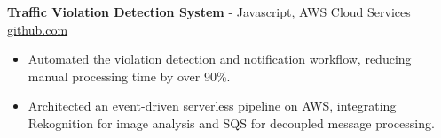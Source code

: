 \documentclass[11pt]{article}       %
\begin{document}

\textbf{Traffic Violation Detection System}{ - Javascript, AWS Cloud Services} \hfill \href{https://github.com/Monica20030707/AWS_rekonigition-N-read-database}{github.com} \\
\vspace{-9pt}
\begin{itemize}
  \item Automated the violation detection and notification workflow, reducing manual processing time by over 90\%.
  \item Architected an event-driven serverless pipeline on AWS, integrating Rekognition for image analysis and SQS for decoupled message processing.
\end{itemize}
\end{document}
